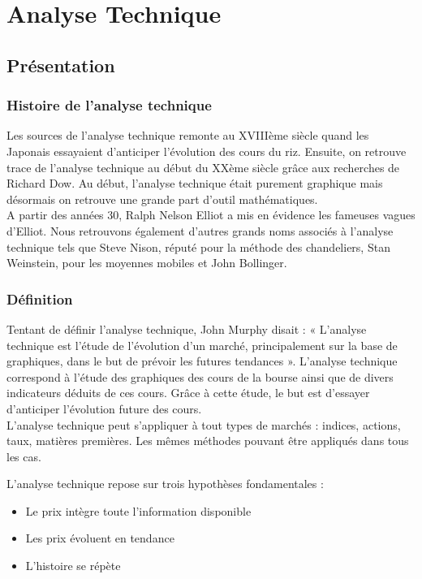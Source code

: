\section{Analyse Technique}

\subsection{Présentation}

\subsubsection{Histoire de l'analyse technique}
Les sources de l'analyse technique remonte au XVIIIème siècle quand les Japonais essayaient d'anticiper l'évolution des cours du riz. Ensuite, on retrouve trace de l'analyse technique au début du XXème siècle grâce aux recherches de Richard Dow. Au début, l'analyse technique était purement graphique mais désormais on retrouve une grande part d'outil mathématiques. \\

A partir des années 30, Ralph Nelson Elliot a mis en évidence les fameuses vagues d'Elliot. Nous retrouvons également d'autres grands noms associés à l'analyse technique tels que Steve Nison, réputé pour la méthode des chandeliers, Stan Weinstein, pour les moyennes mobiles et John Bollinger. \\


\subsubsection{Définition}
Tentant de définir l’analyse technique, John Murphy disait : « L’analyse technique est l’étude de l’évolution d’un marché, principalement sur la base de graphiques, dans le but de prévoir les futures tendances ». L'analyse technique correspond à l'étude des graphiques des cours de la bourse ainsi que de divers indicateurs déduits de ces cours. Grâce à cette étude, le but est d'essayer d'anticiper l'évolution future des cours. \\

L'analyse technique peut s'appliquer à tout types de marchés : indices, actions, taux, matières premières. Les mêmes méthodes pouvant être appliqués dans tous les cas. 

L'analyse technique repose sur trois hypothèses fondamentales :
\begin{itemize}
\item Le prix intègre toute l'information disponible
\item Les prix évoluent en tendance
\item L'histoire se répète
\end{itemize}


